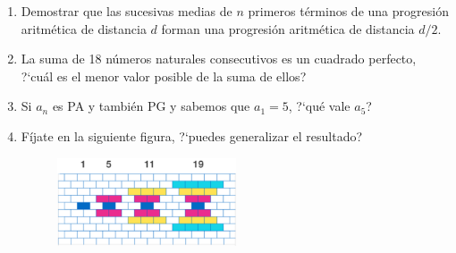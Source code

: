 \vspace{5mm}
\begin{enumerate}

%
\item	Demostrar que las sucesivas medias de $n$ primeros términos de una progresión aritmética de distancia $d$ forman una progresión aritmética de distancia $d/2$.

\vspace{-6mm}
\begin{flushright}
\begin{footnotesize} \textcolor{gris}{}

 \textcolor{gris}{}	\end{footnotesize}
\end{flushright}


%
\item	La suma de 18 números naturales consecutivos es un cuadrado perfecto, ?`cuál es el menor valor posible de la suma de ellos?

\vspace{-6mm}
\begin{flushright}
\begin{footnotesize} \textcolor{gris}{}	\end{footnotesize}
\end{flushright}


%
\item	Si $a_n$ es PA y también PG y sabemos que $a_1=5$, ?`qué vale $a_5$? 

\vspace{-6mm}
\begin{flushright}
\begin{footnotesize} \textcolor{gris}{}	\end{footnotesize}
\end{flushright}


%
\item	Fíjate en la siguiente figura, ?`puedes generalizar el resultado?

\begin{figure}[H]
	\centering
	\includegraphics[width=0.5\textwidth]{img-suc/suc06.png}
\end{figure} 


\end{enumerate}
